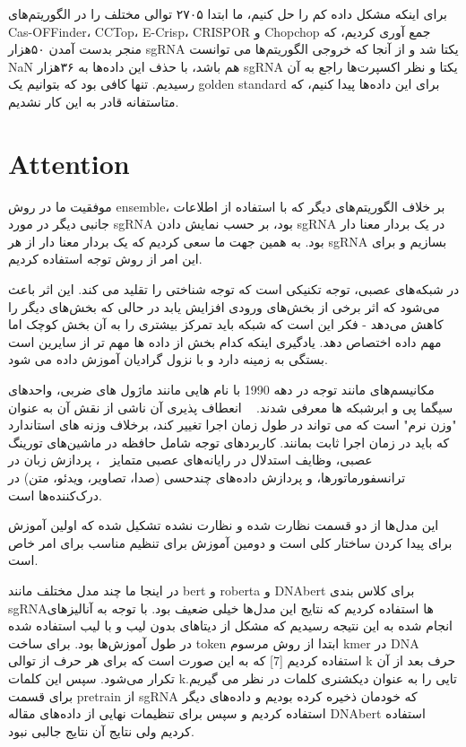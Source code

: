 \documentclass[12pt,a4paper,BCOR=.7cm,headsepline,bibliography=totoc]{report}
\begin{document}
برای اینکه مشکل داده کم را حل کنیم، ما ابتدا ۲۷۰۵ توالی مختلف را در الگوریتم‌های Cas-OFFinder، CCTop، E-Crisp، CRISPOR و Chopchop جمع آوری کردیم، که منجر بدست آمدن ۵۰هزار sgRNA یکتا شد و از آنجا که خروجی الگوریتم‌ها می توانست NaN هم باشد، با حذف این داده‌ها به ۳۶هزار sgRNA یکتا و نظر اکسپرت‌ها راجع به آن رسیدیم. تنها کافی بود که بتوانیم یک golden standard برای این داده‌ها پیدا کنیم، که متاستفانه قادر به این کار نشدیم.

\section{Attention}
موفقیت ما در روش ensemble، بر خلاف الگوریتم‌های دیگر که با استفاده از اطلاعات جانبی دیگر در مورد sgRNA بود، بر حسب نمایش دادن sgRNA در یک بردار معنا دار بود. به همین جهت ما سعی کردیم که یک بردار معنا دار از هر ‌sgRNA بسازیم و برای این امر از روش توجه استفاده کردیم.

در شبکه‌های عصبی، توجه تکنیکی است که توجه شناختی را تقلید می کند. این اثر باعث می‌شود که اثر برخی از بخش‌های ورودی افزایش یابد در حالی که بخش‌های دیگر را کاهش می‌دهد - فکر این است که شبکه باید تمرکز بیشتری را به آن بخش کوچک اما مهم داده اختصاص دهد. یادگیری اینکه کدام بخش از داده ها مهم تر از سایرین است بستگی به زمینه دارد و با نزول گرادیان آموزش داده می شود.

مکانیسم‌های مانند توجه در دهه 1990 با نام هایی مانند ماژول های ضربی، واحدهای سیگما پی و ابرشبکه ها معرفی شدند. ~\cite{Yann} انعطاف پذیری آن ناشی از نقش آن به عنوان "وزن نرم" است که می تواند در طول زمان اجرا تغییر کند، برخلاف وزنه های استاندارد که باید در زمان اجرا ثابت بمانند. کاربردهای توجه شامل حافظه در ماشین‌های تورینگ عصبی، وظایف استدلال در رایانه‌های عصبی متمایز ~\cite{Hybrid}، پردازش زبان در ترانسفورماتورها، و پردازش داده‌های چندحسی (صدا، تصاویر، ویدئو، متن) در درک‌کننده‌ها است.~\cite{nature,Vaswani, Ramachandran, Jaegle, Ray} 	

این مدل‌ها از دو قسمت نظارت شده و  نظارت نشده تشکیل شده که اولین آموزش برای پیدا کردن ساختار کلی است و دومین آموزش برای تنظیم مناسب برای امر خاص است.

در اینجا ما چند مدل مختلف مانند bert و roberta و DNAbert برای کلاس بندی sgRNAها استفاده کردیم که نتایج این مدل‌ها خیلی ضعیف بود. با توجه به آنالیزهای انجام شده به این نتیجه رسیدیم که مشکل از دیتاهای بدون لیب و با لیب استفاده شده در طول آموزش‌ها بود. برای ساخت token ابتدا از روش مرسوم kmer در DNA استفاده کردیم [7] که به این صورت است که برای هر حرف از توالی k حرف بعد از آن تکرار می‌شود. سپس این کلمات kتایی را به عنوان دیکشنری کلمات در نظر می گیریم. برای قسمت pretrain از sgRNA که خودمان ذخیره کرده بودیم و داده‌های دیگر استفاده کردیم و سپس برای تنظیمات نهایی از داده‌های مقاله DNAbert استفاده کردیم ولی نتایج آن نتایج جالبی نبود.
\end{document}

